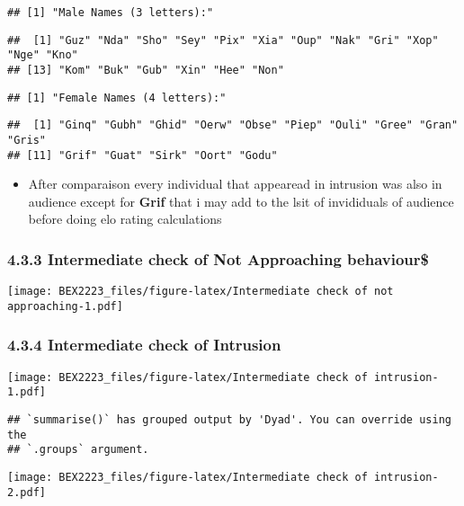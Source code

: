 \documentclass[
]{article}
\providecommand{\tightlist}{%
  \setlength{\itemsep}{0pt}\setlength{\parskip}{0pt}}
\begin{document}
\begin{verbatim}
## [1] "Male Names (3 letters):"
\end{verbatim}

\begin{verbatim}
##  [1] "Guz" "Nda" "Sho" "Sey" "Pix" "Xia" "Oup" "Nak" "Gri" "Xop" "Nge" "Kno"
## [13] "Kom" "Buk" "Gub" "Xin" "Hee" "Non"
\end{verbatim}

\begin{verbatim}
## [1] "Female Names (4 letters):"
\end{verbatim}

\begin{verbatim}
##  [1] "Ginq" "Gubh" "Ghid" "Oerw" "Obse" "Piep" "Ouli" "Gree" "Gran" "Gris"
## [11] "Grif" "Guat" "Sirk" "Oort" "Godu"
\end{verbatim}

\begin{itemize}
\tightlist
\item
  After comparaison every individual that appearead in intrusion was
  also in audience except for \textbf{Grif} that i may add to the lsit
  of invididuals of audience before doing elo rating calculations
\end{itemize}

\hypertarget{intermediate-check-of-not-approaching-behaviour}{%
\subsubsection{4.3.3 Intermediate check of Not Approaching
behaviour\$}\label{intermediate-check-of-not-approaching-behaviour}}

\texttt{[image: BEX2223\_files/figure-latex/Intermediate check of not approaching-1.pdf]}

\hypertarget{intermediate-check-of-intrusion}{%
\subsubsection{4.3.4 Intermediate check of
Intrusion}\label{intermediate-check-of-intrusion}}

\texttt{[image: BEX2223\_files/figure-latex/Intermediate check of intrusion-1.pdf]}

\begin{verbatim}
## `summarise()` has grouped output by 'Dyad'. You can override using the
## `.groups` argument.
\end{verbatim}

\texttt{[image: BEX2223\_files/figure-latex/Intermediate check of intrusion-2.pdf]}
\end{document}
